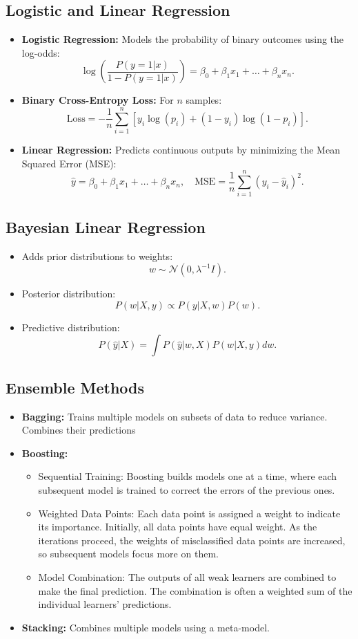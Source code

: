 \documentclass[12pt,a4paper]{article}
\begin{document}
\subsection{Logistic and Linear Regression}
\begin{itemize}
    \item \textbf{Logistic Regression:} Models the probability of binary outcomes using the log-odds:
    \[ \log\left(\frac{P(y=1|x)}{1 - P(y=1|x)}\right) = \beta_0 + \beta_1 x_1 + \dots + \beta_n x_n. \]
    \item \textbf{Binary Cross-Entropy Loss:} For $n$ samples:
    \[ \text{Loss} = -\frac{1}{n} \sum_{i=1}^n \left[ y_i \log(p_i) + (1 - y_i) \log(1 - p_i) \right]. \]
    \item \textbf{Linear Regression:} Predicts continuous outputs by minimizing the Mean Squared Error (MSE):
    \[ \hat{y} = \beta_0 + \beta_1 x_1 + \dots + \beta_n x_n, \quad \text{MSE} = \frac{1}{n} \sum_{i=1}^n (y_i - \hat{y}_i)^2. \]
\end{itemize}
\subsection{Bayesian Linear Regression}
\begin{itemize}
    \item Adds prior distributions to weights:
    \[ w \sim \mathcal{N}(0, \lambda^{-1} I). \]
    \item Posterior distribution:
    \[ P(w|X, y) \propto P(y|X, w) P(w). \]
    \item Predictive distribution:
    \[ P(\hat{y}|X) = \int P(\hat{y}|w, X) P(w|X, y) dw. \]
\end{itemize}

\subsection{Ensemble Methods}
\begin{itemize}
    \item \textbf{Bagging:} Trains multiple models on subsets of data to reduce variance. Combines their predictions
    \item \textbf{Boosting:} \begin{itemize}
        \item Sequential Training: Boosting builds models one at a time, where each subsequent model is trained to correct the errors of the previous ones.
        \item Weighted Data Points: Each data point is assigned a weight to indicate its importance. Initially, all data points have equal weight. As the iterations proceed, the weights of misclassified data points are increased, so subsequent models focus more on them.
        \item Model Combination: The outputs of all weak learners are combined to make the final prediction. The combination is often a weighted sum of the individual learners' predictions.
    \end{itemize}

    \item \textbf{Stacking:} Combines multiple models using a meta-model.
\end{itemize}
\end{document}
